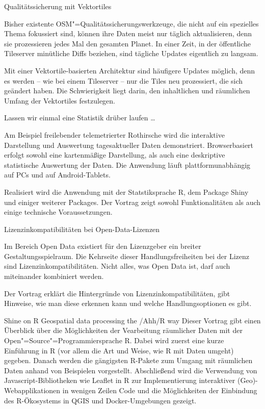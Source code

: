 %
{Qualitätssicherung mit Vektortiles}%
{}%
{Bisher existente OSM"=Qualitätssicherungswerkzeuge, die nicht auf ein spezielles Thema fokussiert sind,
  können ihre Daten meist nur täglich aktualisieren, denn sie prozessieren jedes Mal den gesamten
  Planet. In einer Zeit, in der öffentliche Tileserver minütliche Diffs beziehen, sind tägliche
  Updates eigentlich zu langsam.

Mit einer Vektortile-basierten Architektur sind häufigere Updates möglich, denn es werden – wie bei
einem Tileserver – nur die Tiles neu prozessiert, die sich geändert haben. Die Schwierigkeit liegt
darin, den inhaltlichen und räumlichen Umfang der Vektortiles festzulegen.}

%
{Lassen wir einmal eine Statistik \mbox{drüber} laufen \dots}%
{}%
{Am Beispiel freilebender telemetrierter Rothirsche wird die interaktive Darstellung und Auswertung
tagesaktueller Daten demonstriert. Browserbasiert erfolgt sowohl eine kartenmäßige Darstellung,
als auch eine deskriptive statistische Auswertung der Daten.
Die Anwendung läuft plattformunabhängig auf
PCs und auf Android-Tablets.

Realisiert wird die Anwendung mit der Statstiksprache R, dem Package Shiny und einiger weiterer
Packages. Der Vortrag zeigt sowohl Funktionalitäten als auch einige technische Voraussetzungen.}

%
{Lizenzinkompatibilitäten bei Open-Data-Lizenzen}%
{}%
{Im Bereich Open Data existiert für den Lizenzgeber ein breiter Gestaltungsspielraum. Die Kehrseite
  dieser Handlungsfreiheiten bei der Lizenz sind Lizenzinkompatibilitäten. Nicht alles, was Open Data
  ist, darf auch miteinander kombiniert werden.

Der Vortrag erklärt die Hintergründe von Lizenzinkompatibilitäten, gibt Hinweise, wie man diese
erkennen kann und welche Handlungsoptionen es gibt.}

%
{Shine on R}%
{Geospatial data processing the /Ahh/R way}%
{Dieser Vortrag gibt einen Überblick über die Möglichkeiten der Vearbeitung räumlicher Daten mit der
  Open"=Source"=Programmiersprache R. Dabei wird zuerst eine kurze Einführung in R (vor allem die Art
  und Weise, wie R mit Daten umgeht) gegeben. Danach werden die gängigsten R-Pakete zum Umgang mit
  räumlichen Daten anhand von Beispielen vorgestellt. Abschließend wird die Verwendung von
  Javascript-Bibliotheken wie Leaflet in R zur Implementierung interaktiver (Geo)-Webapplikationen
  in wenigen Zeilen Code und die Möglichkeiten der Einbindung des R-Ökosystems in QGIS und
  Docker-Umgebungen gezeigt.}

